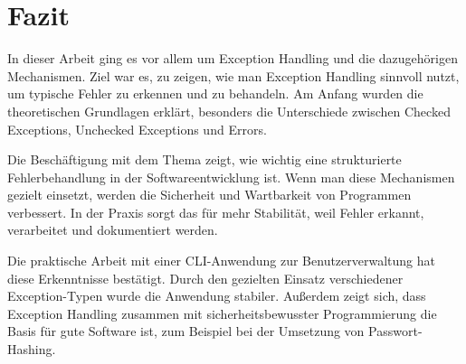 \section{Fazit}
In dieser Arbeit ging es vor allem um Exception Handling und die dazugehörigen Mechanismen. Ziel war es, zu zeigen, wie man Exception Handling sinnvoll nutzt, um typische Fehler zu erkennen und zu behandeln. Am Anfang wurden die theoretischen Grundlagen erklärt, besonders die Unterschiede zwischen Checked Exceptions, Unchecked Exceptions und Errors.
 
Die Beschäftigung mit dem Thema zeigt, wie wichtig eine strukturierte Fehlerbehandlung in der Softwareentwicklung ist. Wenn man diese Mechanismen gezielt einsetzt, werden die Sicherheit und Wartbarkeit von Programmen verbessert. In der Praxis sorgt das für mehr Stabilität, weil Fehler erkannt, verarbeitet und dokumentiert werden.
 
Die praktische Arbeit mit einer CLI-Anwendung zur Benutzerverwaltung hat diese Erkenntnisse bestätigt. Durch den gezielten Einsatz verschiedener Exception-Typen wurde die Anwendung stabiler. Außerdem zeigt sich, dass Exception Handling zusammen mit sicherheitsbewusster Programmierung die Basis für gute Software ist, zum Beispiel bei der Umsetzung von Passwort-Hashing.
